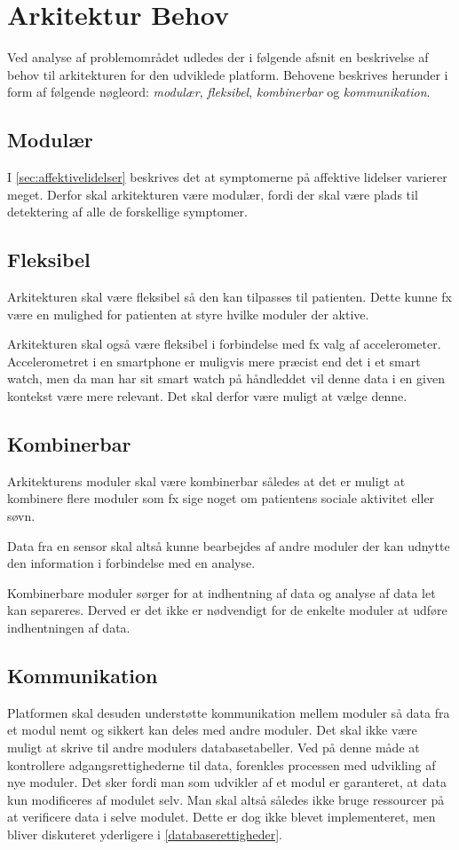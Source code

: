 \section{Arkitektur Behov}\label{arkitekturkrav}
Ved analyse af problemområdet udledes der i følgende afsnit en beskrivelse af behov til arkitekturen for den udviklede platform.
Behovene beskrives herunder i form af følgende nøgleord: \textit{modulær}, \textit{fleksibel}, \textit{kombinerbar} og \textit{kommunikation}.

\subsection{Modulær}
I \cref{sec:affektivelidelser} beskrives det at symptomerne på affektive lidelser varierer meget.
Derfor skal arkitekturen være modulær, fordi der skal være plads til detektering af alle de forskellige symptomer.

\subsection{Fleksibel}
Arkitekturen skal være fleksibel så den kan tilpasses til patienten.
Dette kunne fx være en mulighed for patienten at styre hvilke moduler der aktive.

Arkitekturen skal også være fleksibel i forbindelse med fx valg af accelerometer.
Accelerometret i en smartphone er muligvis mere præcist end det i et smart watch, men da man har sit smart watch på håndleddet vil denne data i en given kontekst være mere relevant.
Det skal derfor være muligt at vælge denne.

\subsection{Kombinerbar}%
Arkitekturens moduler skal være kombinerbar således at det er muligt at kombinere flere moduler som fx sige noget om patientens sociale aktivitet eller søvn.

Data fra en sensor skal altså kunne bearbejdes af andre moduler der kan udnytte den information i forbindelse med en analyse.

Kombinerbare moduler sørger for at indhentning af data og analyse af data let kan separeres.
Derved er det ikke er nødvendigt for de enkelte moduler at udføre indhentningen af data.

\subsection{Kommunikation}
Platformen skal desuden understøtte kommunikation mellem moduler så data fra et modul nemt og sikkert kan deles med andre moduler.
Det skal ikke være muligt at skrive til andre modulers databasetabeller.
Ved på denne måde at kontrollere adgangsrettighederne til data, forenkles processen med udvikling af nye moduler.
Det sker fordi man som udvikler af et modul er garanteret, at data kun modificeres af modulet selv.
Man skal altså således ikke bruge ressourcer på at verificere data i selve modulet.
Dette er dog ikke blevet implementeret, men bliver diskuteret yderligere i \cref{databaserettigheder}.


